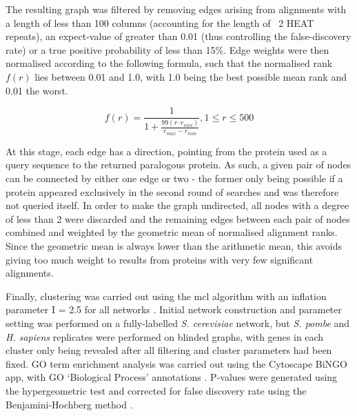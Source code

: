 \documentclass[a4paper,11pt,twoside,openright]{scrbook}
\begin{document}
The resulting graph was filtered by removing edges arising from alignments with
a length of less than 100 columns (accounting for the length of ~2 HEAT
repeats), an expect-value of greater than 0.01 (thus controlling the
false-discovery rate) or a true positive probability of less than 15\%. Edge
weights were then normalised according to the following formula, such that the
normalised rank $f(r)$ lies between 0.01 and 1.0, with 1.0 being the best
possible mean rank and 0.01 the worst.

\begin{displaymath}
    f(r) = \frac{1}{1 + \frac{99(r – r_{min} )}{r_{max} - r_{min}}}, 1 \leq r
    \leq 500
\end{displaymath}

At this stage, each edge has a direction, pointing from the protein used as a
query sequence to the returned paralogous protein. As such, a given pair of
nodes can be connected by either one edge or two - the former only being
possible if a protein appeared exclusively in the second round of searches and
was therefore not queried itself. In order to make the graph undirected, all
nodes with a degree of less than 2 were discarded and the remaining edges
between each pair of nodes combined and weighted by the geometric mean of
normalised alignment ranks. Since the geometric mean is always lower than the
arithmetic mean, this avoids giving too much weight to results from proteins
with very few significant alignments.

Finally, clustering was carried out using the mcl algorithm with an inflation
parameter I = 2.5 for all networks \cite{VanDongen2000}. Initial network
construction and parameter setting was performed on a fully-labelled \textit{S.
cerevisiae} network, but \textit{S. pombe} and \textit{H. sapiens} replicates
were performed on blinded graphs, with genes in each cluster only being revealed
after all filtering and cluster parameters had been fixed. GO term enrichment
analysis was carried out using the Cytoscape BiNGO app, with GO `Biological
Process' annotations \cite{Maere2005}. P-values were generated using the
hypergeometric test and corrected for false discovery rate using the
Benjamini-Hochberg method \cite{Benjamini1995,Maere2005}.
\end{document}
